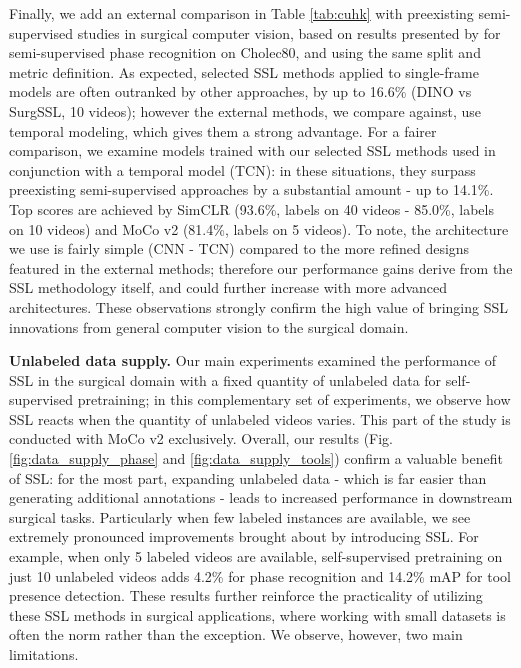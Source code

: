 \documentclass[times,twocolumn,final]{elsarticle}
\begin{document}
{\color{changetext} Finally, we add an external comparison in Table \ref{tab:cuhk} with preexisting semi-supervised studies in surgical computer vision, based on results presented by \cite{shi_surgssl} for semi-supervised phase recognition on Cholec80, and using the same split and metric definition. As expected, selected SSL methods applied to single-frame models are often outranked by other approaches, by up to 16.6\% (DINO vs SurgSSL, 10 videos); however the external methods, we compare against, use temporal modeling, which gives them a strong advantage. For a fairer comparison, we examine models trained with our selected SSL methods used in conjunction with a temporal model (TCN): in these situations, they surpass preexisting semi-supervised approaches by a substantial amount - up to 14.1\%. Top  scores are achieved by SimCLR (93.6\%, labels on 40 videos - 85.0\%, labels on 10 videos) and MoCo v2 (81.4\%, labels on 5 videos). To note, the architecture we use is fairly simple (CNN - TCN) compared to the more refined designs featured in the external methods; therefore our performance gains derive from the SSL methodology itself, and could further increase with more advanced architectures. These observations strongly confirm the high value of bringing SSL innovations from general computer vision to the surgical domain.}

\noindent\textbf{Unlabeled data supply. } Our main experiments examined the performance of SSL in the surgical domain with a fixed quantity of unlabeled data for self-supervised pretraining; in this complementary set of experiments, we observe how SSL reacts when the quantity of unlabeled videos varies. This part of the study is conducted with MoCo v2 exclusively. Overall, our results (Fig. \ref{fig:data_supply_phase} and \ref{fig:data_supply_tools}) confirm a valuable benefit of SSL: for the most part, expanding unlabeled data - which is far easier than generating additional annotations - leads to increased performance in downstream surgical tasks. Particularly when few labeled instances are available, we see extremely pronounced improvements brought about by introducing SSL. For example, when only 5 labeled videos are available, self-supervised pretraining on just 10 unlabeled videos adds {\color{changetext}4.2\%}  for phase recognition and {\color{changetext}14.2\%} mAP for tool presence detection. These results further reinforce the practicality of utilizing these SSL methods in surgical applications, where working with small datasets is often the norm rather than the exception. We observe, however, two main limitations.
\end{document}
